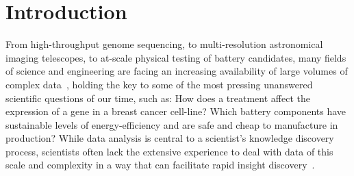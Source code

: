 \section{Introduction\label{intro}} 
From high-throughput genome sequencing, 
to multi-resolution astronomical imaging telescopes,
to at-scale physical testing of battery candidates,
many fields of science and engineering
are facing an increasing availability of 
large volumes of complex data~\cite{AustinNothaft2015,Demchenko2013},
holding the key to some of the most pressing 
unanswered scientific questions of our time,
such as: How does a treatment affect the 
expression of a gene in a breast cancer cell-line? 
Which battery components have sustainable levels 
of energy-efficiency and are safe and cheap to 
manufacture in production?  
While data analysis is central to a scientist's 
knowledge discovery process, scientists 
often lack the extensive experience to deal 
with data of this scale and complexity 
in a way that can facilitate rapid insight discovery~\cite{Kersten2011}. 

